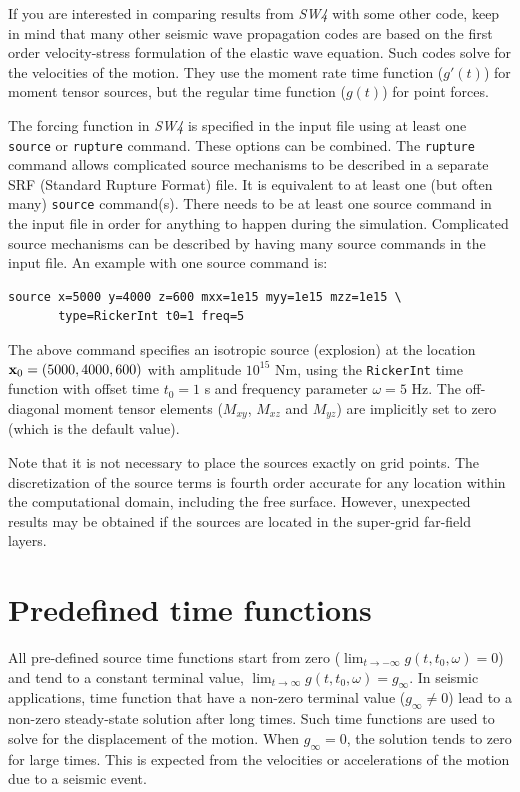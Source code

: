 \documentclass[11pt]{report}
\begin{document}
If you are interested in comparing results from \emph{SW4} with some other code, keep in mind that
many other seismic wave propagation codes are based on the first order velocity-stress formulation
of the elastic wave equation. Such codes solve for the velocities of the motion. They use the moment
rate time function ($g'(t)$) for moment tensor sources, but the regular time function ($g(t)$) for
point forces.

The forcing function in \emph{SW4} is specified in the input file using at least one {\tt source} or
{\tt rupture} command. These options can be combined. The {\tt rupture} command allows complicated
source mechanisms to be described in a separate SRF (Standard Rupture Format) file. It is equivalent
to at least one (but often many) {\tt source} command(s). There needs to be at least one source
command in the input file in order for anything to happen during the simulation. Complicated source
mechanisms can be described by having many source commands in the input file. An example with one
source command is:
\begin{verbatim}
source x=5000 y=4000 z=600 mxx=1e15 myy=1e15 mzz=1e15 \
       type=RickerInt t0=1 freq=5
\end{verbatim}
The above command specifies an isotropic source (explosion) at the location ${\bf
  x}_0=(5000,4000,600)$ with amplitude $10^{15}$ Nm, using the {\tt RickerInt} time function with
offset time $t_0=1$ s and frequency parameter $\omega=5$ Hz. The off-diagonal moment tensor elements
($M_{xy}$, $M_{xz}$ and $M_{yz}$) are implicitly set to zero (which is the default value).

Note that it is not necessary to place the sources exactly on grid points. The discretization of the
source terms is fourth order accurate for any location within the computational domain, including
the free surface. However, unexpected results may be obtained if the sources are located in the
super-grid far-field layers.


\section{Predefined time functions}\label{sec:predefined}

All pre-defined source time functions start from zero ($\lim_{t\to -\infty} g(t,t_0,\omega) = 0$)
and tend to a constant terminal value, $\lim_{t\to \infty} g(t,t_0,\omega) = g_\infty$. In seismic
applications, time function that have a non-zero terminal value ($g_\infty\ne 0$) lead to a non-zero
steady-state solution after long times. Such time functions are used to solve for the displacement
of the motion. When $g_\infty = 0$, the solution tends to zero for large times. This is
expected from the velocities or accelerations of the motion due to a seismic event.
\end{document}
